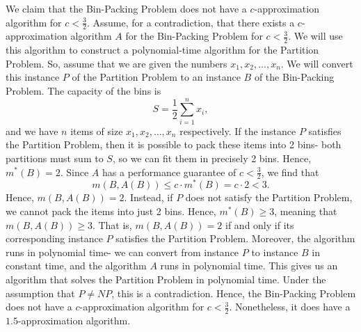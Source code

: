 \documentclass[a4paper, openany]{memoir}
\begin{document}
    We claim that the Bin-Packing Problem does not have a $c$-approximation algorithm for $c < \frac{3}{2}$. Assume, for a contradiction, that there exists a $c$-approximation algorithm $A$ for the Bin-Packing Problem for $c < \frac{3}{2}$. We will use this algorithm to construct a polynomial-time algorithm for the Partition Problem. So, assume that we are given the numbers $x_1, x_2, \dots, x_n$. We will convert this instance $P$ of the Partition Problem to an instance $B$ of the Bin-Packing Problem. The capacity of the bins is 
    \[S = \frac{1}{2} \sum_{i=1}^n x_i,\]
    and we have $n$ items of size $x_1, x_2, \dots, x_n$ respectively. If the instance $P$ satisfies the Partition Problem, then it is possible to pack these items into 2 bins- both partitions must sum to $S$, so we can fit them in precisely 2 bins. Hence, $m^*(B) = 2$. Since $A$ has a performance guarantee of $c < \frac{3}{2}$, we find that
    \[m(B, A(B)) \leq c \cdot m^*(B) = c \cdot 2 < 3.\]
    Hence, $m(B, A(B)) = 2$. Instead, if $P$ does not satisfy the Partition Problem, we cannot pack the items into just 2 bins. Hence, $m^*(B) \geq 3$, meaning that $m(B, A(B)) \geq 3$. That is, $m(B, A(B)) = 2$ if and only if its corresponding instance $P$ satisfies the Partition Problem. Moreover, the algorithm runs in polynomial time- we can convert from instance $P$ to instance $B$ in constant time, and the algorithm $A$ runs in polynomial time. This gives us an algorithm that solves the Partition Problem in polynomial time. Under the assumption that $P \neq NP$, this is a contradiction. Hence, the Bin-Packing Problem does not have a $c$-approximation algorithm for $c < \frac{3}{2}$. Nonetheless, it does have a $1.5$-approximation algorithm.
\end{document}
